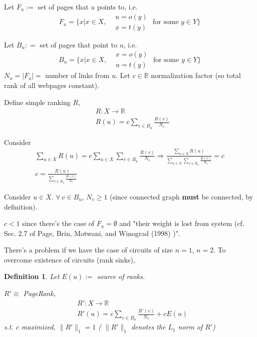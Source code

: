 \documentclass[10pt]{amsart}
\newtheorem{definition}{Definition}
\begin{document}
\begin{multicols*}{2}
Let $F_u := $ set of pages that $u$ points to, i.e. 
\begin{equation}
F_u = \lbrace x | x\in X, \begin{aligned} & u = o(y) \\
& x = t(y) \end{aligned} \text{ for some } y \in Y \rbrace 
\end{equation}

Let $B_u : = $ set of pages that point to $u$, i.e. 
\begin{equation}
	B_u = \lbrace x | x\in X, \begin{aligned} & x = o(y) \\
	& u= t(y) \end{aligned} \text{ for some } y\in Y \rbrace 
\end{equation}
$N_u = |F_u| = $ number of links from $u$.  Let $c\in \mathbb{R}$ normalization factor (so total rank of all webpages constant).  

Define simple ranking $R$, 
\begin{equation}
\begin{aligned}
& R:X \to \mathbb{R}  \\
& R(u) = c\sum_{ v\in B_u } \frac{R(v) }{N_v}
\end{aligned}
\end{equation}

Consider 
\[
\begin{gathered}
\sum_{u \in X} R(u) = c\sum_{u \in X} \sum_{v\in B_u} \frac{R(v) }{ N_v} \Longrightarrow \frac{ \sum_{u\in X} R(u)}{ \sum_{u\in X} \sum_{ v\in B_u } \frac{R(v)}{N_v} } = c   \\
	c=\frac{R(u)}{ \sum_{v\in B_u } \frac{R(v) }{ N_v} }
\end{gathered}
\]

Consider $u \in X$.  $\forall \, v \in B_u$, $N_v \geq 1$ (since connected graph \textbf{must} be connected, by definition).  

$c<1$ since there's the case of $F_u = \emptyset$ and "their weight is lost from system (cf. Sec. 2.7 of Page, Brin, Motwani, and Winograd (1998) \cite{PBMW1998})".  

There's a problem if we have the case of circuits of size $n=1$, $n=2$.  To overcome existence of circuits (rank sinks), 
\begin{definition}
	Let $E(u) := $ source of ranks.  
	
	$R' \equiv $ PageRank, 
	\begin{equation}
	\begin{aligned}
	& R' : X\to \mathbb{R}  \\
	& R'(u) = c\sum_{v\in B_u } \frac{R'(v)}{N_v} + cE(u)
	\end{aligned}
	\end{equation}
s.t. $c$ maximized, $\| R' \|_1 = 1$ ( $\| R' \|_1$ denotes the $L_1$ norm of $R'$)	
\end{definition}


\end{multicols*}
\end{document}
